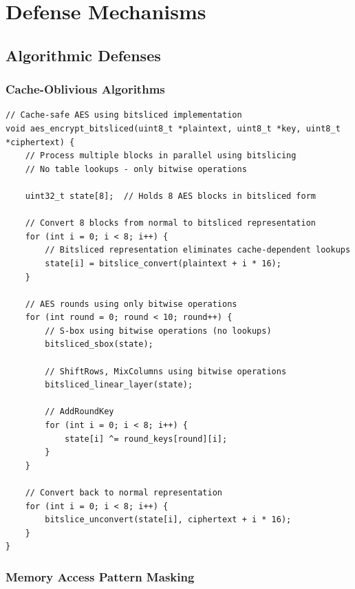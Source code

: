 \documentclass[11pt,a4paper]{article}
\theoremstyle{definition}
\begin{document}
\section{Defense Mechanisms}

\subsection{Algorithmic Defenses}

\subsubsection{Cache-Oblivious Algorithms}

\begin{lstlisting}[caption={Cache-Safe AES Implementation}]
// Cache-safe AES using bitsliced implementation
void aes_encrypt_bitsliced(uint8_t *plaintext, uint8_t *key, uint8_t *ciphertext) {
    // Process multiple blocks in parallel using bitslicing
    // No table lookups - only bitwise operations
    
    uint32_t state[8];  // Holds 8 AES blocks in bitsliced form
    
    // Convert 8 blocks from normal to bitsliced representation
    for (int i = 0; i < 8; i++) {
        // Bitsliced representation eliminates cache-dependent lookups
        state[i] = bitslice_convert(plaintext + i * 16);
    }
    
    // AES rounds using only bitwise operations
    for (int round = 0; round < 10; round++) {
        // S-box using bitwise operations (no lookups)
        bitsliced_sbox(state);
        
        // ShiftRows, MixColumns using bitwise operations  
        bitsliced_linear_layer(state);
        
        // AddRoundKey
        for (int i = 0; i < 8; i++) {
            state[i] ^= round_keys[round][i];
        }
    }
    
    // Convert back to normal representation
    for (int i = 0; i < 8; i++) {
        bitslice_unconvert(state[i], ciphertext + i * 16);
    }
}
\end{lstlisting}

\subsubsection{Memory Access Pattern Masking}
\end{document}
